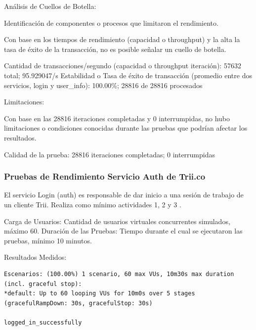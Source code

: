 \documentclass[
  paper=a4,
  ,captions=tableheading
]{scrartcl}
\renewenvironment{quote}{\begin{customblockquote}\list{}{\rightmargin=0em\leftmargin=0em}%
\item\relax\color{blockquote-text}\ignorespaces}{\unskip\unskip\endlist\end{customblockquote}}
\begin{document}
Análisis de Cuellos de Botella:

\begin{quote}
Identificación de componentes o procesos que limitaron el rendimiento.

Con base en los tiempos de rendimiento (capacidad o throughput) y la
alta la tasa de éxito de la transacción, no es posible señalar un cuello
de botella.

Cantidad de transacciones/segundo (capacidad o throughput iteración):
57632 total; 95.929047/s Estabilidad o Tasa de éxito de transacción
(promedio entre dos servicios, login y user\_info): 100.00\%; 28816 de
28816 procesados
\end{quote}

Limitaciones:

\begin{quote}
Con base en las 28816 iteraciones completadas y 0 interrumpidas, no hubo
limitaciones o condiciones conocidas durante las pruebas que podrían
afectar los resultados.

Calidad de la prueba: 28816 iteraciones completadas; 0 interrumpidas
\end{quote}

\subsubsection{Pruebas de Rendimiento Servicio Auth de
Trii.co}\label{sec:pruebas-de-rendimiento-servicio-auth-de-trii.co}

El servicio Login (auth) es responsable de dar inicio a una sesión de
trabajo de un cliente Trii. Realiza como mínimo actividades 1, 2 y 3 .

Carga de Usuarios: Cantidad de usuarios virtuales concurrentes
simulados, máximo 60. Duración de las Pruebas: Tiempo durante el cual se
ejecutaron las pruebas, mínimo 10 minutos.

Resultados Medidos:

\begin{verbatim}
Escenarios: (100.00%) 1 scenario, 60 max VUs, 10m30s max duration (incl. graceful stop):
*default: Up to 60 looping VUs for 10m0s over 5 stages (gracefulRampDown: 30s, gracefulStop: 30s)

logged_in_successfully
\end{verbatim}
\end{document}
